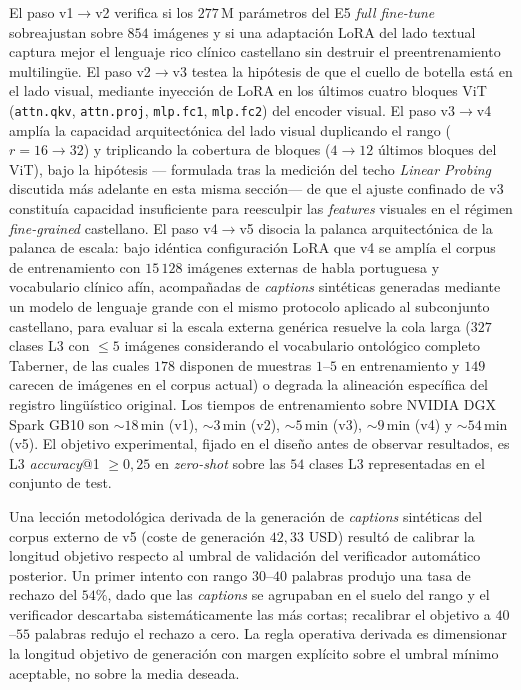 El paso v1$\to$v2 verifica si los $277$\,M parámetros del E5
\emph{full fine-tune} sobreajustan sobre $854$ imágenes y si una
adaptación LoRA del lado textual captura mejor el lenguaje rico
clínico castellano sin destruir el preentrenamiento multilingüe.
El paso v2$\to$v3 testea la hipótesis de que el cuello de botella
está en el lado visual, mediante inyección de LoRA en los
últimos cuatro bloques ViT (\texttt{attn.qkv}, \texttt{attn.proj},
\texttt{mlp.fc1}, \texttt{mlp.fc2}) del encoder visual. El paso
v3$\to$v4 amplía la capacidad arquitectónica del lado visual
duplicando el rango ($r=16\to32$) y triplicando la cobertura de
bloques ($4\to12$ últimos bloques del ViT), bajo la hipótesis ---
formulada tras la medición del techo \emph{Linear Probing}
discutida más adelante en esta misma sección--- de que el ajuste
confinado de v3 constituía capacidad insuficiente para reesculpir
las \emph{features} visuales en el régimen \emph{fine-grained}
castellano. El paso v4$\to$v5 disocia la palanca arquitectónica de
la palanca de escala: bajo idéntica configuración LoRA que v4 se
amplía el corpus de entrenamiento con $15\,128$ imágenes externas
de habla portuguesa y vocabulario clínico afín, acompañadas de
\emph{captions} sintéticas generadas mediante un modelo de lenguaje
grande con el mismo protocolo aplicado al subconjunto castellano,
para evaluar si la escala externa genérica resuelve la cola larga
($327$ clases L3 con $\leq 5$ imágenes considerando el vocabulario
ontológico completo Taberner, de las cuales $178$ disponen de
muestras $1$--$5$ en entrenamiento y $149$ carecen de imágenes en
el corpus actual) o degrada la alineación específica del registro
lingüístico original. Los tiempos de entrenamiento sobre NVIDIA DGX Spark GB10
son $\sim 18$\,min (v1), $\sim 3$\,min (v2), $\sim 5$\,min (v3),
$\sim 9$\,min (v4) y $\sim 54$\,min (v5). El objetivo experimental,
fijado en el diseño antes de observar resultados, es L3
\emph{accuracy}@1 $\geq 0{,}25$ en \emph{zero-shot} sobre las $54$
clases L3 representadas en el conjunto de test.

Una lección metodológica derivada de la generación de
\emph{captions} sintéticas del corpus externo de v5 (coste de
generación $42{,}33$ USD) resultó de calibrar la longitud
objetivo respecto al umbral de validación del verificador
automático posterior. Un primer intento con rango $30$--$40$
palabras produjo una tasa de rechazo del $54\%$, dado que las
\emph{captions} se agrupaban en el suelo del rango y el
verificador descartaba sistemáticamente las más cortas;
recalibrar el objetivo a $40$--$55$ palabras redujo el rechazo a
cero. La regla operativa derivada es dimensionar la longitud
objetivo de generación con margen explícito sobre el umbral
mínimo aceptable, no sobre la media deseada.


